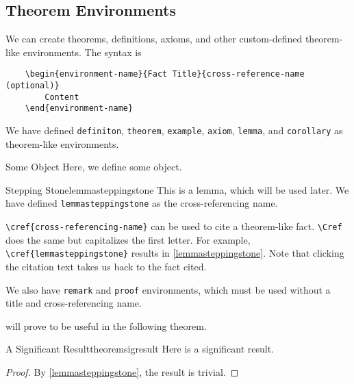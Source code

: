 
\subsection{Theorem Environments}

We can create theorems, definitions, axioms, and other custom-defined theorem-like environments. The syntax is
\begin{verbatim}
    \begin{environment-name}{Fact Title}{cross-reference-name (optional)}
        Content
    \end{environment-name}
\end{verbatim}
We have defined \verb|definiton|, \verb|theorem|, \verb|example|, \verb|axiom|, \verb|lemma|, and \verb|corollary| as
theorem-like environments.

\begin{definition}{Some Object}{}
    Here, we define some object.
\end{definition}

\begin{lemma}{Stepping Stone}{lemmasteppingstone}
    This is a lemma, which will be used later. We have defined \verb|lemmasteppingstone| as the cross-referencing name.
\end{lemma}

\verb|\cref{cross-referencing-name}| can be used to cite a theorem-like fact. \verb|\Cref| does the same but
capitalizes the first letter. For example, \verb|\cref{lemmasteppingstone}| results in \cref{lemmasteppingstone}. Note
that clicking the citation text takes us back to the fact cited.

We also have \verb|remark| and \verb|proof| environments, which must be used without a title and cross-referencing
name.

\begin{remark}{}{}
     will prove to be useful in the following theorem.
\end{remark}

\begin{theorem}{A Significant Result}{theoremsigresult}
    Here is a significant result.
\end{theorem}

\begin{proof}{}{}
    By \cref{lemmasteppingstone}, the result is trivial.
\end{proof}

